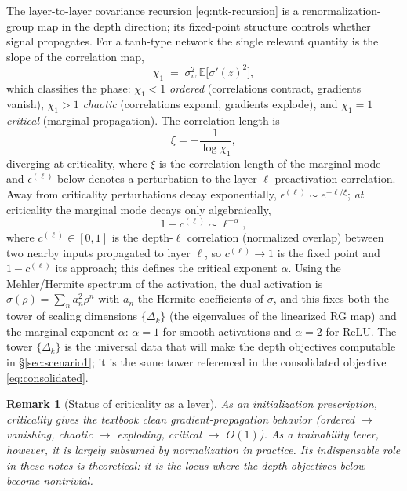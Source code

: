 \documentclass[11pt]{article}
\newtheorem{remark}{Remark}
\theoremstyle{definition}
\newcommand{\E}{\mathbb{E}}
\begin{document}
The layer-to-layer covariance recursion \eqref{eq:ntk-recursion} is a renormalization-group
map in the depth direction; its fixed-point structure controls whether signal propagates.
For a tanh-type network the single relevant quantity is the slope of the correlation map,
\begin{equation}
\chi_1 \;=\; \sigma_w^2\,\E\big[\sigma'(z)^2\big],
\label{eq:chi1}
\end{equation}
which classifies the phase: $\chi_1<1$ \emph{ordered} (correlations contract, gradients
vanish), $\chi_1>1$ \emph{chaotic} (correlations expand, gradients explode), and $\chi_1=1$
\emph{critical} (marginal propagation). The correlation length is
\begin{equation}
\xi=-\frac{1}{\log\chi_1},
\label{eq:xi}
\end{equation}
diverging at criticality, where $\xi$ is the correlation length of the marginal mode and
$\epsilon^{(\ell)}$ below denotes a perturbation to the layer-$\ell$ preactivation
correlation. Away from criticality perturbations decay exponentially,
$\epsilon^{(\ell)}\sim e^{-\ell/\xi}$; \emph{at} criticality the marginal mode decays only
algebraically,
\begin{equation}
1-c^{(\ell)}\sim \ell^{-\alpha},
\label{eq:marginal}
\end{equation}
where $c^{(\ell)}\in[0,1]$ is the depth-$\ell$ correlation (normalized overlap) between two
nearby inputs propagated to layer $\ell$, so $c^{(\ell)}\to1$ is the fixed point and
$1-c^{(\ell)}$ its approach; this defines the critical exponent $\alpha$. Using the Mehler/Hermite spectrum of the
activation, the dual activation is $\hat\sigma(\rho)=\sum_n a_n^2\rho^n$ with $a_n$ the
Hermite coefficients of $\sigma$, and this fixes both the tower of scaling dimensions
$\{\Delta_k\}$ (the eigenvalues of the linearized RG map) and the marginal exponent
$\alpha$: $\alpha=1$ for smooth activations and $\alpha=2$ for ReLU. The tower
$\{\Delta_k\}$ is the universal data that will make the depth objectives computable in
\S\ref{sec:scenario1}; it is the same tower referenced in the consolidated objective
\eqref{eq:consolidated}.

\begin{remark}[Status of criticality as a lever]
As an \emph{initialization} prescription, criticality gives the textbook clean
gradient-propagation behavior (ordered $\to$ vanishing, chaotic $\to$ exploding, critical
$\to$ $O(1)$). As a \emph{trainability} lever, however, it is largely subsumed by
normalization in practice. Its indispensable role in these notes is theoretical: it is the
locus where the depth objectives below become nontrivial.
\end{remark}
\end{document}
